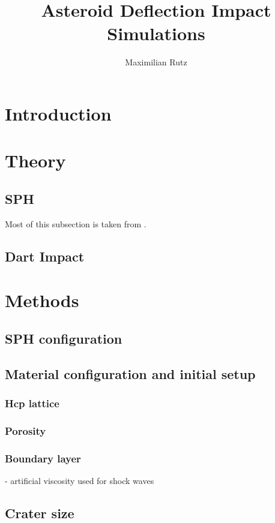 \documentclass{article}
\title{Asteroid Deflection Impact Simulations}
\author{Maximilian Rutz}
\date{}
\begin{document}
	\maketitle
	\begin{abstract}
	 
	\end{abstract}
	
	\newpage
	\tableofcontents
	 
	\newpage
	\section{Introduction} 
	\section{Theory}
		\subsection{SPH}
			Most of this subsection is taken from \cite{Jutzi_p_alpha_1}.	
		\subsection{Dart Impact}
	\section{Methods}
		\subsection{SPH configuration}
		\subsection{Material configuration and initial setup}
			\subsubsection{Hcp lattice}
			\subsubsection{Porosity}			
			\subsubsection{Boundary layer}
			- artificial viscosity used for shock waves			
		\subsection{Crater size}
\end{document}
